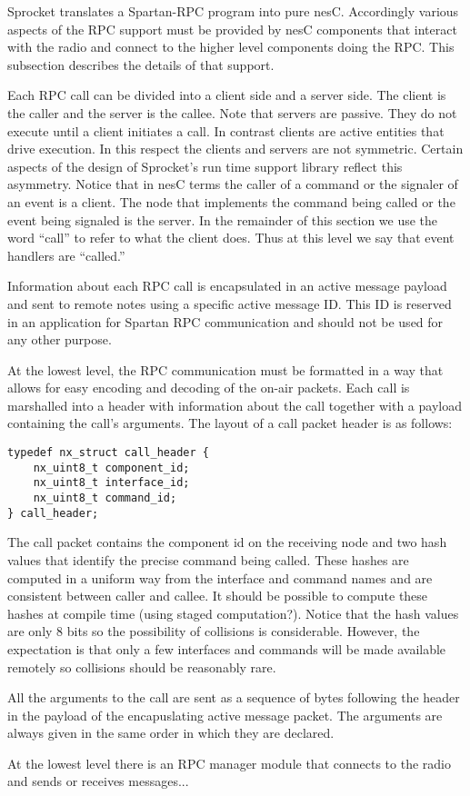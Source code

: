 Sprocket translates a Spartan-RPC program into pure nesC. Accordingly various aspects of the RPC
support must be provided by nesC components that interact with the radio and connect to the
higher level components doing the RPC. This subsection describes the details of that support.

Each RPC call can be divided into a client side and a server side. The client is the caller and
the server is the callee. Note that servers are passive. They do not execute until a client
initiates a call. In contrast clients are active entities that drive execution. In this respect
the clients and servers are not symmetric. Certain aspects of the design of Sprocket's run time
support library reflect this asymmetry. Notice that in nesC terms the caller of a command or the
signaler of an event is a client. The node that implements the command being called or the event
being signaled is the server. In the remainder of this section we use the word ``call'' to refer
to what the client does. Thus at this level we say that event handlers are ``called.''

Information about each RPC call is encapsulated in an active message payload and sent to remote
notes using a specific active message ID. This ID is reserved in an application for Spartan RPC
communication and should not be used for any other purpose.

At the lowest level, the RPC communication must be formatted in a way that allows for easy
encoding and decoding of the on-air packets. Each call is marshalled into a header with
information about the call together with a payload containing the call's arguments. The layout
of a call packet header is as follows:

\begin{verbatim}
typedef nx_struct call_header {
    nx_uint8_t component_id;
    nx_uint8_t interface_id;
    nx_uint8_t command_id;
} call_header;
\end{verbatim}

The call packet contains the component id on the receiving node and two hash values that
identify the precise command being called. These hashes are computed in a uniform way from the
interface and command names and are consistent between caller and callee. It should be possible
to compute these hashes at compile time (using staged computation?). Notice that the hash values
are only 8 bits so the possibility of collisions is considerable. However, the expectation is
that only a few interfaces and commands will be made available remotely so collisions should be
reasonably rare.

All the arguments to the call are sent as a sequence of bytes following the header in the
payload of the encapuslating active message packet. The arguments are always given in the same
order in which they are declared.

At the lowest level there is an RPC manager module that connects to the radio and sends or
receives messages...

